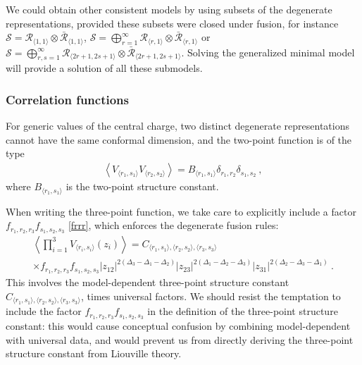 \documentclass[12pt, a4paper, notitlepage, twoside]{report}
\numberwithin{equation}{section}
\theoremstyle{break}
\begin{document}
We could obtain other consistent models by using subsets of the degenerate representations, provided these subsets were closed under fusion, for instance $\mathcal{S}=\mathcal{\mathcal{R}}_{\langle 1,1 \rangle}\otimes \bar{\mathcal{R}}_{\langle 1,1 \rangle}$, $\mathcal{S}=\bigoplus_{r=1}^\infty \mathcal{R}_{\langle r,1 \rangle}\otimes \bar{\mathcal{R}}_{\langle r,1 \rangle}$ or $\mathcal{S}=\bigoplus_{r,s=1}^{\infty} \mathcal{R}_{\langle 2r+1,2s+1 \rangle}\otimes \bar{\mathcal{R}}_{\langle 2r+1,2s+1 \rangle}$.
Solving the generalized minimal model will provide a solution of all these submodels. 

\subsubsection{Correlation functions}

For generic values of the central charge, two distinct degenerate representations cannot have the same conformal dimension, and the two-point function is of the type 
\begin{align}
 \left\langle V_{\langle r_1,s_1 \rangle} V_{\langle r_2,s_2 \rangle} \right\rangle = B_{\langle r_1,s_1 \rangle} \delta_{r_1,r_2} \delta_{s_1,s_2}\ ,
\label{vvdd}
\end{align}
where $B_{\langle r_1,s_1\rangle}$ is the two-point structure constant.

When writing the three-point function, we take care to explicitly include a factor $f_{r_1,r_2,r_3} f_{s_1,s_2,s_3}$ \eqref{frrr}, which enforces the degenerate fusion rules:
\begin{multline}
 \left\langle \prod_{i=1}^3 V_{\langle r_i,s_i \rangle}(z_i) \right\rangle = C_{\langle r_1,s_1\rangle ,\langle r_2,s_2\rangle ,\langle r_3,s_3 \rangle}  
\\ \times 
f_{r_1,r_2,r_3} f_{s_1,s_2,s_3} |z_{12}|^{2(\Delta_3-\Delta_1-\Delta_2)} |z_{23}|^{2(\Delta_1-\Delta_2-\Delta_3)} |z_{31}|^{2(\Delta_2-\Delta_3-\Delta_1)}\ .
\end{multline}
This involves the model-dependent three-point structure constant $C_{\langle r_1,s_1\rangle ,\langle r_2,s_2\rangle ,\langle r_3,s_3 \rangle}$, times universal factors. We should resist the temptation to include the factor $f_{r_1,r_2,r_3} f_{s_1,s_2,s_3}$ in the definition of the three-point structure constant: this would cause conceptual confusion by combining model-dependent with universal data, and would prevent us from directly deriving the three-point structure constant from Liouville theory.
\end{document}
